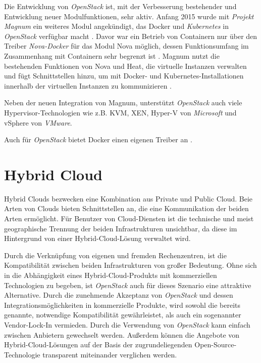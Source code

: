 \documentclass[../main.tex]{subfiles}
\begin{document}
      Die Entwicklung von \emph{OpenStack} ist, mit der Verbesserung bestehender und Entwicklung neuer Modulfunktionen, sehr aktiv. Anfang 2015 wurde mit \emph{Projekt Magnum} ein weiteres Modul angekündigt, das Docker und \emph{Kubernetes} in \emph{OpenStack} verfügbar macht \cite{openStackMagnum}. Davor war ein Betrieb von Containern nur über den Treiber \emph{Nova-Docker} für das Modul Nova möglich, dessen Funktionsumfang im Zusammenhang mit Containern sehr begrenzt ist \cite{heiseOpenStackContainer}\cite{openStackDocker}.
      Magnum nutzt die bestehenden Funktionen von Nova und Heat, die virtuelle Instanzen verwalten und fügt Schnittstellen hinzu, um mit Docker- und Kubernetes-Installationen innerhalb der virtuellen Instanzen zu kommunizieren \cite{openStackMagnum}.

      Neben der neuen Integration von Magnum, unterstützt \emph{OpenStack} auch viele Hypervisor-Technologien wie z.B. KVM, XEN, Hyper-V von \emph{Microsoft} und vSphere von \emph{VMware}.

      Auch für \emph{OpenStack} bietet Docker einen eigenen Treiber an \cite{dockerMachineDriverOpenStack}.



  \section{Hybrid Cloud}
  \label{hybridCloud}
    Hybrid Clouds bezwecken eine Kombination aus Private und Public Cloud. Beie Arten von Clouds bieten Schnittstellen an, die eine Kommunikation der beiden Arten ermöglicht. Für Benutzer von Cloud-Diensten ist die technische und meist geographische Trennung der beiden Infrastrukturen unsichtbar, da diese im Hintergrund von einer Hybrid-Cloud-Lösung verwaltet wird.

    Durch die Verknüpfung von eigenen und fremden Rechenzentren, ist die Kompatibilität zwischen beiden Infrastrukturen von großer Bedeutung. Ohne sich in die Abhängigkeit eines Hybrid-Cloud-Produkts mit kommerziellen Technologien zu begeben, ist \emph{OpenStack} auch für dieses Szenario eine attraktive Alternative. Durch die zunehmende Akzeptanz von \emph{OpenStack} und dessen Integrationsmöglichkeiten in kommerzielle Produkte, wird sowohl die bereits genannte, notwendige Kompatibilität gewährleistet, als auch ein sogenannter Vendor-Lock-In vermieden. Durch die Verwendung von \emph{OpenStack} kann einfach zwischen Anbietern gewechselt werden. Außerdem können die Angebote von Hybrid-Cloud-Lösungen auf der Basis der zugrundeliegenden Open-Source-Technologie transparent miteinander verglichen werden.
\end{document}
